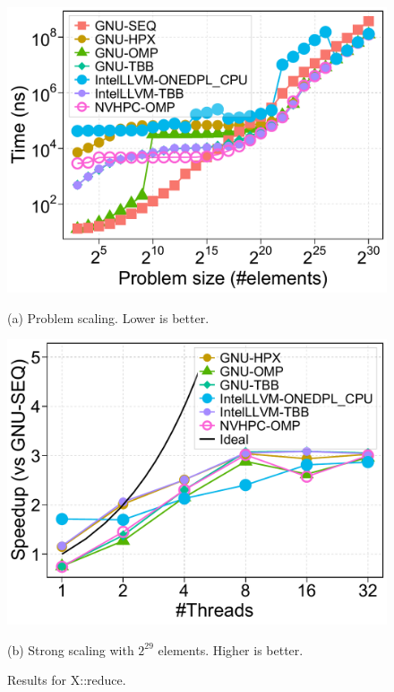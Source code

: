 \documentclass[sigconf]{acmart}
\begin{document}
\begin{figure}[H]
      \centering
      \begin{minipage}[t]{0.48\linewidth}
            \centering
            \includegraphics[width=\linewidth]{figures/problemSize_time-reduce}
            \caption*{(a) Problem scaling. Lower is better.}
      \end{minipage}
      \hfill
      \begin{minipage}[t]{0.48\linewidth}
            \centering
            \includegraphics[width=\linewidth]{figures/speedup_threads-reduce}
            \caption*{(b) Strong scaling with $2^{29}$ elements. Higher is better.}
      \end{minipage}
      \caption{Results for X::reduce.}\label{fig:x::reduce}
\end{figure}
\end{document}
